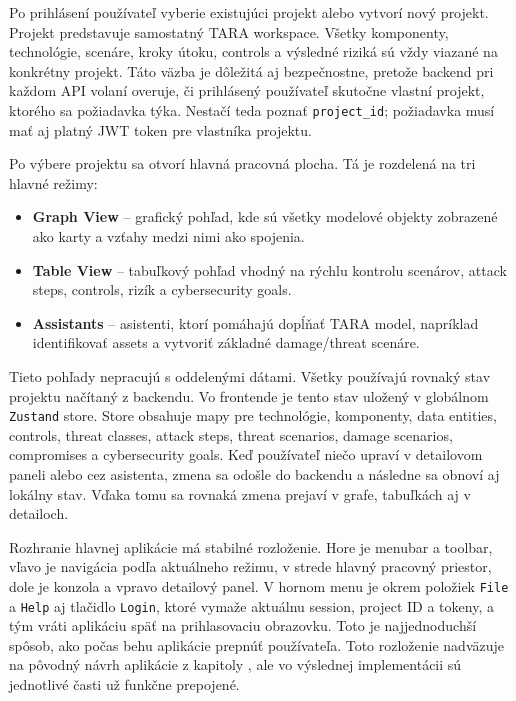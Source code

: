 \documentclass[11pt]{article}
\begin{document}
Po prihlásení používateľ vyberie existujúci projekt alebo vytvorí nový projekt. Projekt predstavuje samostatný TARA workspace. Všetky komponenty, technológie, scenáre, kroky útoku, controls a výsledné riziká sú vždy viazané na konkrétny projekt. Táto väzba je dôležitá aj bezpečnostne, pretože backend pri každom API volaní overuje, či prihlásený používateľ skutočne vlastní projekt, ktorého sa požiadavka týka. Nestačí teda poznať \texttt{project\_id}; požiadavka musí mať aj platný JWT token pre vlastníka projektu.

Po výbere projektu sa otvorí hlavná pracovná plocha. Tá je rozdelená na tri hlavné režimy:

\begin{itemize}
    \item \textbf{Graph View} -- grafický pohľad, kde sú všetky modelové objekty zobrazené ako karty a vzťahy medzi nimi ako spojenia.
    \item \textbf{Table View} -- tabuľkový pohľad vhodný na rýchlu kontrolu scenárov, attack steps, controls, rizík a cybersecurity goals.
    \item \textbf{Assistants} -- asistenti, ktorí pomáhajú dopĺňať TARA model, napríklad identifikovať assets a vytvoriť základné damage/threat scenáre.
\end{itemize}

Tieto pohľady nepracujú s oddelenými dátami. Všetky používajú rovnaký stav projektu načítaný z backendu. Vo frontende je tento stav uložený v globálnom \texttt{Zustand} store. Store obsahuje mapy pre technológie, komponenty, data entities, controls, threat classes, attack steps, threat scenarios, damage scenarios, compromises a cybersecurity goals. Keď používateľ niečo upraví v detailovom paneli alebo cez asistenta, zmena sa odošle do backendu a následne sa obnoví aj lokálny stav. Vďaka tomu sa rovnaká zmena prejaví v grafe, tabuľkách aj v detailoch.

Rozhranie hlavnej aplikácie má stabilné rozloženie. Hore je menubar a toolbar, vľavo je navigácia podľa aktuálneho režimu, v strede hlavný pracovný priestor, dole je konzola a vpravo detailový panel. V hornom menu je okrem položiek \texttt{File} a \texttt{Help} aj tlačidlo \texttt{Login}, ktoré vymaže aktuálnu session, project ID a tokeny, a tým vráti aplikáciu späť na prihlasovaciu obrazovku. Toto je najjednoduchší spôsob, ako počas behu aplikácie prepnúť používateľa. Toto rozloženie nadväzuje na pôvodný návrh aplikácie z kapitoly , ale vo výslednej implementácii sú jednotlivé časti už funkčne prepojené.
\end{document}
